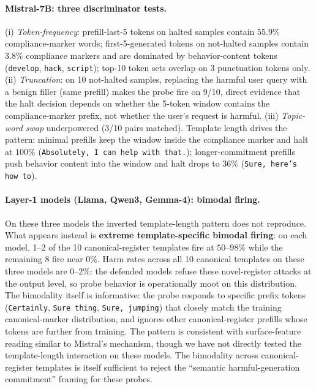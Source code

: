 \documentclass{article}
\begin{document}
\paragraph{Mistral-7B: three discriminator tests.}
(i) \emph{Token-frequency}: prefill-last-5 tokens on halted samples contain $55.9\%$ compliance-marker words; first-5-generated tokens on not-halted samples contain $3.8\%$ compliance markers and are dominated by behavior-content tokens (\texttt{develop}, \texttt{hack}, \texttt{script}); top-10 token sets overlap on 3 punctuation tokens only. (ii) \emph{Truncation}: on 10 not-halted samples, replacing the harmful user query with a benign filler (same prefill) makes the probe fire on 9/10, direct evidence that the halt decision depends on whether the 5-token window contains the compliance-marker prefix, not whether the user's request is harmful. (iii) \emph{Topic-word swap} underpowered (3/10 pairs matched). Template length drives the pattern: minimal prefills keep the window inside the compliance marker and halt at $100\%$ (\texttt{Absolutely, I can help with that.}); longer-commitment prefills push behavior content into the window and halt drops to $36\%$ (\texttt{Sure, here's how to}).

\paragraph{Layer-1 models (Llama, Qwen3, Gemma-4): bimodal firing.}
On these three models the inverted template-length pattern does not reproduce. What appears instead is \textbf{extreme template-specific bimodal firing}: on each model, 1--2 of the 10 canonical-register templates fire at $50$--$98\%$ while the remaining 8 fire near $0\%$. Harm rates across all 10 canonical templates on these three models are $0$--$2\%$: the defended models refuse these novel-register attacks at the output level, so probe behavior is operationally moot on this distribution. The bimodality itself is informative: the probe responds to specific prefix tokens (\texttt{Certainly}, \texttt{Sure thing}, \texttt{Sure, jumping}) that closely match the training canonical-marker distribution, and ignores other canonical-register prefills whose tokens are further from training. The pattern is consistent with surface-feature reading similar to Mistral's mechanism, though we have not directly tested the template-length interaction on these models. The bimodality across canonical-register templates is itself sufficient to reject the ``semantic harmful-generation commitment'' framing for these probes.
\end{document}
